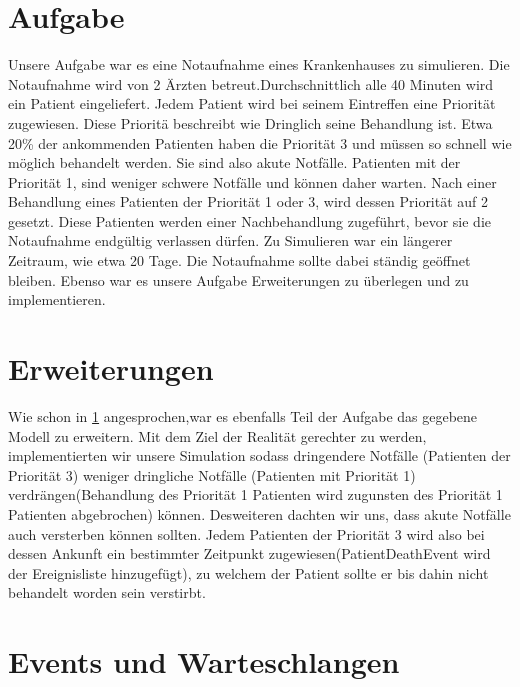 \documentclass[12pt,fleqn,a4paper]{article}
\begin{document}
\section{Aufgabe}\label{sec:Aufgabe}
Unsere Aufgabe war es eine Notaufnahme eines Krankenhauses zu simulieren. Die Notaufnahme wird von 2 \"{A}rzten betreut.Durchschnittlich alle 40 Minuten wird ein Patient eingeliefert. Jedem Patient wird bei seinem Eintreffen eine Priorit\"{a}t zugewiesen.
Diese Priorit\"{a} beschreibt wie Dringlich seine Behandlung ist.
Etwa 20\% der ankommenden Patienten haben die Priorit\"{a}t 3 und m\"{u}ssen so schnell wie m\"{o}glich behandelt werden. Sie sind also akute Notf\"{a}lle. Patienten mit der Priorit\"{a}t 1, sind weniger schwere Notf\"{a}lle und k\"{o}nnen daher warten. Nach einer Behandlung eines Patienten der Priorit\"{a}t 1 oder 3, wird dessen Priorit\"{a}t auf 2 gesetzt. Diese Patienten werden einer Nachbehandlung zugef\"{u}hrt, bevor sie die Notaufnahme endg\"{u}ltig verlassen d\"{u}rfen.
Zu Simulieren war ein l\"{a}ngerer Zeitraum, wie etwa 20 Tage. Die Notaufnahme sollte dabei st\"{a}ndig ge\"{o}ffnet bleiben.
Ebenso war es unsere Aufgabe Erweiterungen zu \"{u}berlegen und zu implementieren.

\section{Erweiterungen}
Wie schon in \ref{sec:Aufgabe} angesprochen,war es ebenfalls Teil der Aufgabe das gegebene Modell zu erweitern.
Mit dem Ziel der Realit\"{a}t gerechter zu werden, implementierten wir unsere Simulation sodass dringendere Notf\"{a}lle (Patienten der Priorit\"{a}t 3) weniger dringliche Notf\"{a}lle (Patienten mit Priorit\"{a}t 1) verdr\"{a}ngen(Behandlung des Priorit\"{a}t 1 Patienten wird zugunsten des Priorit\"{a}t 1 Patienten abgebrochen) k\"{o}nnen. 
Desweiteren dachten wir uns, dass akute Notf\"{a}lle auch versterben k\"{o}nnen sollten. Jedem Patienten der Priorit\"{a}t 3 wird also bei dessen Ankunft ein bestimmter Zeitpunkt zugewiesen(PatientDeathEvent wird der Ereignisliste hinzugef\"{u}gt), zu welchem der Patient sollte er bis dahin nicht behandelt worden sein verstirbt.

\section{Events und Warteschlangen}
\end{document}
